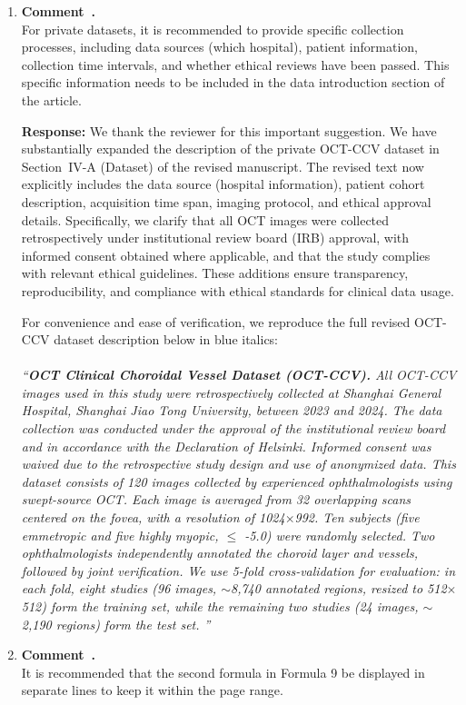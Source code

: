 \documentclass[11pt]{article}
\newcommand{\commentresponse}[2]{{\color{blue}\textbf{Response:} #2}}
\newcommand{\commentitem}{\item \textbf{Comment~\arabic{enumi}.}\\\ignorespaces}
\begin{document}
\begin{enumerate}
    \commentitem For private datasets, it is recommended to provide specific collection processes, including data sources (which hospital), patient information, collection time intervals, and whether ethical reviews have been passed. This specific information needs to be included in the data introduction section of the article.
    
    \commentresponse{2}{
    We thank the reviewer for this important suggestion.
    We have substantially expanded the description of the private OCT-CCV dataset in Section~IV-A (Dataset) of the revised manuscript.
    The revised text now explicitly includes the data source (hospital information), patient cohort description, acquisition time span, imaging protocol, and ethical approval details.
    Specifically, we clarify that all OCT images were collected retrospectively under institutional review board (IRB) approval, with informed consent obtained where applicable, and that the study complies with relevant ethical guidelines.
    These additions ensure transparency, reproducibility, and compliance with ethical standards for clinical data usage.

    For convenience and ease of verification, we reproduce the full revised OCT-CCV dataset description below in blue italics:\\
    \\
    \textit{{\color{blue}``\textbf{OCT Clinical Choroidal Vessel Dataset (OCT-CCV).} {All OCT-CCV images used in this study were retrospectively collected at Shanghai General Hospital, Shanghai Jiao Tong University, between 2023 and 2024. The data collection was conducted under the approval of the institutional review board and in accordance with the Declaration of Helsinki. Informed consent was waived due to the retrospective study design and use of anonymized
    data.} This dataset consists of 120 images collected by experienced ophthalmologists using swept-source OCT. Each image is averaged from 32 overlapping scans centered on the fovea, with a resolution of 1024$\times$992. Ten subjects (five emmetropic and five highly myopic, $\leqslant$ -5.0) were randomly selected. Two ophthalmologists independently annotated the choroid layer and vessels, followed by joint verification. We use 5-fold cross-validation for evaluation: in each fold, eight studies (96 images, $\sim$8,740 annotated regions, resized to 512$\times$512) form the training set, while the remaining two studies (24 images, $\sim$2,190 regions) form the test set.
    ''}}
    }

    \commentitem It is recommended that the second formula in Formula 9 be displayed in separate lines to keep it within the page range.
    

\end{enumerate}
\end{document}
